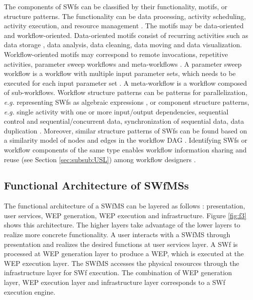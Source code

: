 The components of SWfs can be classified by their
functionality, motifs, or structure patterns. The functionality can be
data processing, activity scheduling, activity execution, and resource
management \cite{Altintas2004}. The motifs may be data-oriented and
workflow-oriented. Data-oriented motifs consist of recurring activities
such as data storage \cite{Balasko2014}, data analysis, data cleaning,
data moving \cite{Balasko2014} and data
visualization. Workflow-oriented motifs may correspond to remote
invocations, repetitive activities, parameter sweep workflows and meta-workflows \cite{Balasko2014,Garijo2014}.
A parameter sweep workflow is a workflow with multiple input parameter sets, which needs to be executed for each input parameter set \cite{Chirigati2012,Gottdank2014}. 
A meta-workflow is a workflow composed of sub-workflows. 
Workflow structure patterns can be patterns for parallelization, \textit{e.g.}
representing SWfs as algebraic
expressions \cite{Ogasawara2013}, or component structure patterns, \textit{e.g.} single activity with one or more input/output dependencies, sequential control and sequential/concurrent data, synchronization of sequential data, data duplication \cite{Yildiz2009}. Moreover, similar structure patterns of SWfs can be found based on a similarity model of nodes and edges in the workflow DAG \cite{Bergmann2011}. 
Identifying SWfs or workflow components of the same
type enables workflow information sharing and reuse (see Section
\ref{sec:subsub:USL}) among workflow designers \cite{Yildiz2009}.

\subsection{Functional Architecture of SWfMSs}
\label{sec:sub:FAS}

The functional architecture of a SWfMS can be layered as follows \cite{Deelman2005,Zhao2007,Altintas2004,Ogasawara2013}:
presentation, user services, WEP generation, WEP execution
and infrastructure. Figure \ref{fig:f3} shows this architecture.
The higher layers take advantage of the lower layers to realize more
concrete functionality. A user interacts with a SWfMS through presentation
and realizes the desired functions at user services layer. 
A SWf is processed at WEP generation layer to produce a WEP, which is executed at the WEP execution layer.
The SWfMS accesses the physical resources through the infrastructure layer for SWf execution.
The combination of WEP generation layer, WEP execution layer and infrastructure layer corresponds to a SWf execution engine.

